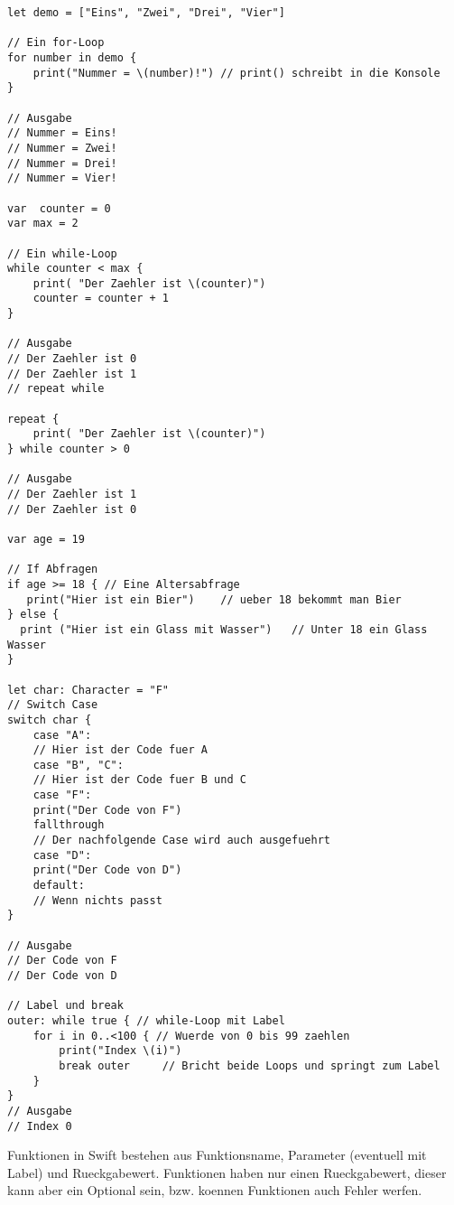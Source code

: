 \begin{lstlisting}
let demo = ["Eins", "Zwei", "Drei", "Vier"]

// Ein for-Loop
for number in demo {
	print("Nummer = \(number)!") // print() schreibt in die Konsole
} 

// Ausgabe
// Nummer = Eins!
// Nummer = Zwei!
// Nummer = Drei!
// Nummer = Vier!

var  counter = 0
var max = 2

// Ein while-Loop
while counter < max {
	print( "Der Zaehler ist \(counter)")
	counter = counter + 1
} 

// Ausgabe
// Der Zaehler ist 0
// Der Zaehler ist 1
// repeat while

repeat {
	print( "Der Zaehler ist \(counter)")
} while counter > 0 

// Ausgabe
// Der Zaehler ist 1
// Der Zaehler ist 0

var age = 19

// If Abfragen
if age >= 18 { // Eine Altersabfrage
   print("Hier ist ein Bier")    // ueber 18 bekommt man Bier
} else {
  print ("Hier ist ein Glass mit Wasser")   // Unter 18 ein Glass Wasser
}

let char: Character = "F"
// Switch Case
switch char {
    case "A":
	// Hier ist der Code fuer A
    case "B", "C":
	// Hier ist der Code fuer B und C
    case "F":
	print("Der Code von F")
	fallthrough 
	// Der nachfolgende Case wird auch ausgefuehrt
    case "D":
	print("Der Code von D")
    default:
	// Wenn nichts passt
} 

// Ausgabe
// Der Code von F
// Der Code von D

// Label und break
outer: while true { // while-Loop mit Label
	for i in 0..<100 { // Wuerde von 0 bis 99 zaehlen
		print("Index \(i)")
		break outer 	// Bricht beide Loops und springt zum Label
	}
} 
// Ausgabe
// Index 0
\end{lstlisting} 
Funktionen in Swift bestehen aus Funktionsname, Parameter (eventuell mit Label) und Rueckgabewert. Funktionen haben nur einen Rueckgabewert, dieser kann aber ein Optional sein, bzw. koennen Funktionen auch Fehler werfen.

